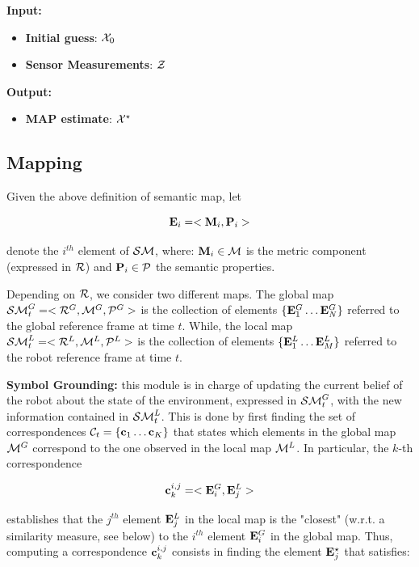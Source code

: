 \documentclass{article}
\begin{document}
	\noindent
	{\bf Input: }
	\begin{itemize}
		\item {\bf Initial guess}: $\mathcal{X}_0$
		\item {\bf Sensor Measurements}: $\mathcal{Z}$
	\end{itemize}
	\noindent
	{\bf Output: }
	\begin{itemize}
		\item {\bf MAP estimate}: $\mathcal{X}^\star$
	\end{itemize}
	
	\subsection{Mapping}
	
	Given the above definition of semantic map, let 
	
	\begin{equation}
	\mathbf{E}_i = < \mathbf{M}_i,\mathbf{P}_i >
	\end{equation}
	
	\noindent
	denote the $i^{th}$ element of $\mathcal{SM}$, where: $\mathbf{M}_i \in \mathcal{M}$ is the metric component (expressed in $\mathcal{R}$) and $\mathbf{P}_i \in \mathcal{P}$ the semantic properties. 
	
	Depending on $\mathcal{R}$, we consider two different maps. The global map $\mathcal{SM}^G_t = < \mathcal{R}^G, \mathcal{M}^G, \mathcal{P}^G >$  is the collection of elements $\{ \mathbf{E}_1^G \dots \mathbf{E}_N^G \}$ referred to the global reference frame at time $t$. While, the local map $\mathcal{SM}^L_t = < \mathcal{R}^L, \mathcal{M}^L, \mathcal{P}^L >$ is the collection of elements $\{ \mathbf{E}_1^L \dots \mathbf{E}_M^L \}$ referred to the robot reference frame at time $t$. 
	
	{\bf Symbol Grounding:}
	this module is in charge of updating the current belief of the robot about the state of the environment, expressed in $\mathcal{SM}^G_t$, with the new information contained in $\mathcal{SM}^L_t$. This is done by first finding the set of correspondences $\mathcal{C}_t = \{\mathbf{c}_1 \dots \mathbf{c}_K\}$ that states which elements in the global map $\mathcal{M}^G$ correspond to the one observed in the local map $\mathcal{M}^L$. In particular, the $k$-th correspondence
	
	\begin{equation}
	\mathbf{c}^{i,j}_k = <\mathbf{E}_i^G,\mathbf{E}_j^L> 
	\end{equation}
	
	\noindent
	establishes that the $j^{th}$ element $\mathbf{E}_j^L$ in the local map is the "closest" (w.r.t. a similarity measure, see below) to the $i^{th}$ element $\mathbf{E}_i^G$ in the global map. Thus, computing a correspondence $\mathbf{c}^{i,j}_k$ consists in finding the element $\mathbf{E}_j^\star$ that satisfies:
	
\end{document}
